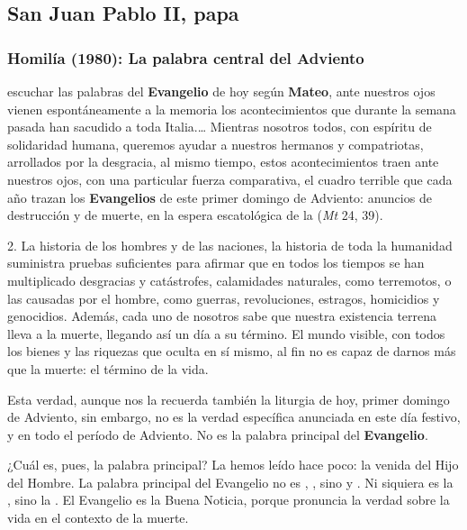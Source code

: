 \subsection{San Juan Pablo II, papa}

\subsubsection{Homilía (1980): La palabra central del Adviento}

	
\begin{body}	
	 escuchar las palabras del \textbf{Evangelio} de hoy según \textbf{Mateo}, ante nuestros ojos vienen espontáneamente a la memoria los acontecimientos que durante la semana pasada han sacudido a toda Italia.\ldots{} Mientras nosotros todos, con espíritu de solidaridad humana, queremos ayudar a nuestros hermanos y compatriotas, arrollados por la desgracia, al mismo tiempo, estos acontecimientos traen ante nuestros ojos, con una particular fuerza comparativa, el cuadro terrible que cada año trazan los \textbf{Evangelios} de este primer domingo de Adviento: anuncios de destrucción y de muerte, en la espera escatológica de la  (\emph{Mt} 24, 39). 
	
	2. La historia de los hombres y de las naciones, la historia de toda la humanidad suministra pruebas suficientes para afirmar que en todos los tiempos se han multiplicado desgracias y catástrofes, calamidades naturales, como terremotos, o las causadas por el hombre, como guerras, revoluciones, estragos, homicidios y genocidios. Además, cada uno de nosotros sabe que nuestra existencia terrena lleva a la muerte, llegando así un día a su término. El mundo visible, con todos los bienes y las riquezas que oculta en sí mismo, al fin no es capaz de darnos más que la muerte: el término de la vida. 
	
	Esta verdad, aunque nos la recuerda también la liturgia de hoy, primer domingo de Adviento, sin embargo, no es la verdad específica anunciada en este día festivo, y en todo el período de Adviento. No es la palabra principal del \textbf{Evangelio}. 
	
	¿Cuál es, pues, la palabra principal? La hemos leído hace poco: la venida del Hijo del Hombre. La palabra principal del Evangelio no es , , sino  y . Ni siquiera es la , sino la . El Evangelio es la Buena Noticia, porque pronuncia la verdad sobre la vida en el contexto de la muerte. 
	

\end{body}
